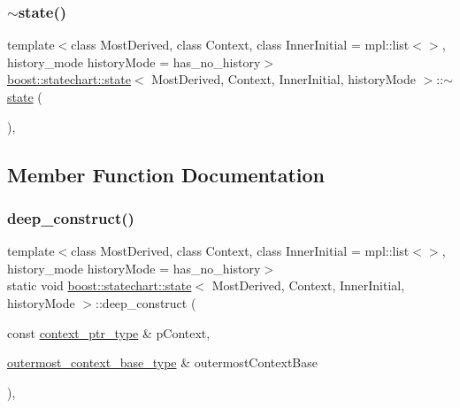 \mbox{\label{classboost_1_1statechart_1_1state_a24834f36d8be502d0afe56984e5b9c7d}} 
\subsubsection{\texorpdfstring{$\sim$state()}{~state()}}
{\footnotesize\ttfamily template$<$class Most\+Derived, class Context, class Inner\+Initial = mpl\+::list$<$$>$, history\+\_\+mode history\+Mode = has\+\_\+no\+\_\+history$>$ \\
\mbox{\hyperlink{classboost_1_1statechart_1_1state}{boost\+::statechart\+::state}}$<$ Most\+Derived, Context, Inner\+Initial, history\+Mode $>$\+::$\sim$\mbox{\hyperlink{classboost_1_1statechart_1_1state}{state}} (\begin{DoxyParamCaption}{ }\end{DoxyParamCaption})\hspace{0.3cm}{\ttfamily [inline]}, {\ttfamily [protected]}}



\subsection{Member Function Documentation}
\mbox{\label{classboost_1_1statechart_1_1state_aed04b0d2e74450ef8d1a2dd821001e39}} 
\subsubsection{\texorpdfstring{deep\+\_\+construct()}{deep\_construct()}}
{\footnotesize\ttfamily template$<$class Most\+Derived, class Context, class Inner\+Initial = mpl\+::list$<$$>$, history\+\_\+mode history\+Mode = has\+\_\+no\+\_\+history$>$ \\
static void \mbox{\hyperlink{classboost_1_1statechart_1_1state}{boost\+::statechart\+::state}}$<$ Most\+Derived, Context, Inner\+Initial, history\+Mode $>$\+::deep\+\_\+construct (\begin{DoxyParamCaption}\item[{const \mbox{\hyperlink{classboost_1_1statechart_1_1simple__state_ac7e361322d53b3f57976ff23056b59e7}{context\+\_\+ptr\+\_\+type}} \&}]{p\+Context,  }\item[{\mbox{\hyperlink{classboost_1_1statechart_1_1simple__state_a50f21d7a7d6632eb34430e74cbad3197}{outermost\+\_\+context\+\_\+base\+\_\+type}} \&}]{outermost\+Context\+Base }\end{DoxyParamCaption})\hspace{0.3cm}{\ttfamily [inline]}, {\ttfamily [static]}}

